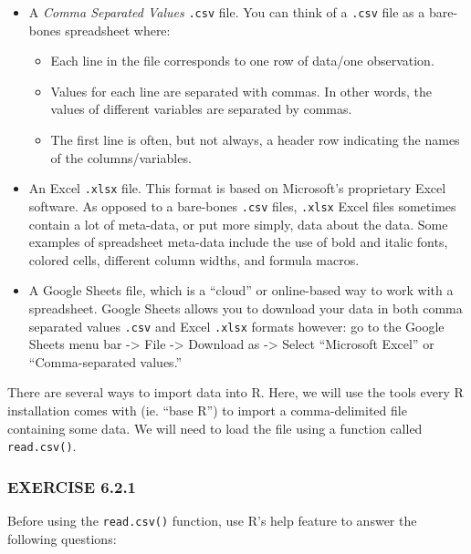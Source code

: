 \documentclass[
]{book}
\providecommand{\tightlist}{%
  \setlength{\itemsep}{0pt}\setlength{\parskip}{0pt}}
\begin{document}
\begin{itemize}
\tightlist
\item
  A \emph{Comma Separated Values} \texttt{.csv} file. You can think of a \texttt{.csv} file as a bare-bones spreadsheet where:

  \begin{itemize}
  \tightlist
  \item
    Each line in the file corresponds to one row of data/one observation.\\
  \item
    Values for each line are separated with commas. In other words, the values of different variables are separated by commas.\\
  \item
    The first line is often, but not always, a header row indicating the names of the columns/variables.\\
  \end{itemize}
\item
  An Excel \texttt{.xlsx} file. This format is based on Microsoft's proprietary Excel software. As opposed to a bare-bones \texttt{.csv} files, \texttt{.xlsx} Excel files sometimes contain a lot of meta-data, or put more simply, data about the data. Some examples of spreadsheet meta-data include the use of bold and italic fonts, colored cells, different column widths, and formula macros.\\
\item
  A Google Sheets file, which is a ``cloud'' or online-based way to work with a spreadsheet. Google Sheets allows you to download your data in both comma separated values \texttt{.csv} and Excel \texttt{.xlsx} formats however: go to the Google Sheets menu bar -\textgreater{} File -\textgreater{} Download as -\textgreater{} Select ``Microsoft Excel'' or ``Comma-separated values.''
\end{itemize}

There are several ways to import data into R. Here, we will use the tools every R installation comes with (ie. ``base R'') to import a comma-delimited file containing some data. We will need to load the file using a function called \texttt{read.csv()}.

\subsubsection*{EXERCISE 6.2.1}\label{exercise-6.2.1}

Before using the \texttt{read.csv()} function, use R's help feature to answer the following questions:
\end{document}
